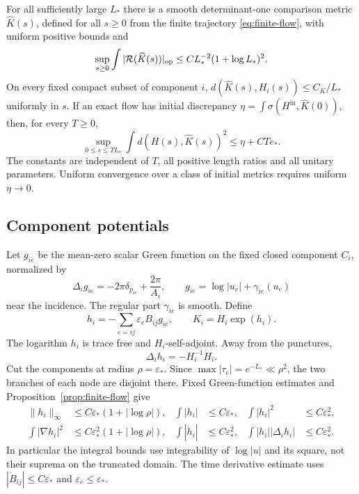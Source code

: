 \begin{theorem}\label{thm:tracking}
For all sufficiently large $L_*$ there is a smooth
determinant-one comparison metric $\widehat K(s)$,
defined for all $s\ge0$ from the finite trajectory
\eqref{eq:finite-flow}, with uniform positive bounds
and
\begin{equation}\label{eq:residual-bound}
 \sup_{s\ge0}\int|\mathcal R(\widehat K(s))|_{\mathrm{op}}
 \le C L_*^{-2}(1+\log L_*)^2.
\end{equation}
On every fixed compact subset of component $i$,
$d(\widehat K(s),H_i(s))\le C_K/L_*$ uniformly in
$s$. If an exact flow has initial discrepancy
$\eta=\int\sigma(H^{\mathrm{in}},\widehat K(0))$,
then, for every $T\ge0$,
\begin{equation}\label{eq:tracking}
 \sup_{0\le s\le TL_*}\int
 d(H(s),\widehat K(s))^2\le\eta+CTe_*.
\end{equation}
The constants are independent of $T$, all positive
length ratios and all unitary parameters. Uniform
convergence over a class of initial metrics requires
uniform $\eta\to0$.
\end{theorem}

\subsection{Component potentials}
Let $g_{ie}$ be the mean-zero scalar Green function
on the fixed closed component $C_i$, normalized by
\[
 \Delta_i g_{ie}=-2\pi\delta_{p_{ie}}+\frac{2\pi}{A_i},
 \qquad g_{ie}=\log|u_e|+\gamma_{ie}(u_e)
\]
near the incidence. The regular part $\gamma_{ie}$
is smooth. Define
\begin{equation}\label{eq:component-correction}
 h_i=-\sum_{e=ij}\varepsilon_e B_{ij}g_{ie},
 \qquad K_i=H_i\exp(h_i).
\end{equation}
The logarithm $h_i$ is trace free and $H_i$-self-adjoint.
Away from the punctures,
\begin{equation}\label{eq:cancellation}
 \Delta_i h_i=-H_i^{-1}\dot H_i.
\end{equation}
Cut the components at radius $\rho=\varepsilon_*$.
Since $\max|\tau_e|=e^{-L_*}\ll\rho^2$, the two
branches of each node are disjoint there.
Fixed Green-function estimates and
Proposition~\ref{prop:finite-flow} give
\begin{equation}\label{eq:green-bounds}
 \begin{aligned}
 \|h_i\|_\infty&\le C\varepsilon_*(1+|\log\rho|),
 &\int|h_i|&\le C\varepsilon_*,
 &\int|h_i|^2&\le C\varepsilon_*^2,\\
 \int|\nabla h_i|^2&\le C\varepsilon_*^2(1+|\log\rho|),
 &\int|\dot h_i|&\le C\varepsilon_*^2,
 &\int|h_i||\Delta_i h_i|&\le C\varepsilon_*^2 .
 \end{aligned}
\end{equation}
In particular the integral bounds use integrability
of $\log|u|$ and its square, not their suprema on
the truncated domain. The time derivative estimate
uses $|\dot B_{ij}|\le C\varepsilon_*$ and
$\varepsilon_e\le\varepsilon_*$.


